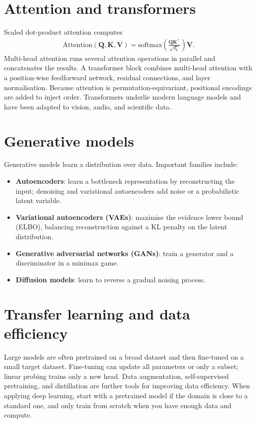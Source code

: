 \documentclass[a4paper, 12pt]{book}
\begin{document}
\section{Attention and transformers}

Scaled dot-product attention computes
\begin{align}
    \mathrm{Attention}(\mathbf{Q},\mathbf{K},\mathbf{V})
    = \mathrm{softmax}\!\left(\frac{\mathbf{Q}\mathbf{K}^\top}{\sqrt{d_k}}\right)\mathbf{V}.
\end{align}
Multi-head attention runs several attention operations in parallel and concatenates
the results. A transformer block combines multi-head attention with a position-wise
feedforward network, residual connections, and layer normalisation. Because attention
is permutation-equivariant, positional encodings are added to inject order.
Transformers underlie modern language models and have been adapted to vision, audio,
and scientific data.

\section{Generative models}

Generative models learn a distribution over data. Important families include:
\begin{itemize}
    \item \textbf{Autoencoders}: learn a bottleneck representation by reconstructing
    the input; denoising and variational autoencoders add noise or a probabilistic
    latent variable.
    \item \textbf{Variational autoencoders (VAEs)}: maximise the evidence lower bound
    (ELBO), balancing reconstruction against a KL penalty on the latent distribution.
    \item \textbf{Generative adversarial networks (GANs)}: train a generator and a
    discriminator in a minimax game.
    \item \textbf{Diffusion models}: learn to reverse a gradual noising process.
\end{itemize}

\section{Transfer learning and data efficiency}

Large models are often pretrained on a broad dataset and then fine-tuned on a small
target dataset. Fine-tuning can update all parameters or only a subset; linear probing
trains only a new head. Data augmentation, self-supervised pretraining, and
distillation are further tools for improving data efficiency. When applying deep
learning, start with a pretrained model if the domain is close to a standard one, and
only train from scratch when you have enough data and compute.
\end{document}
